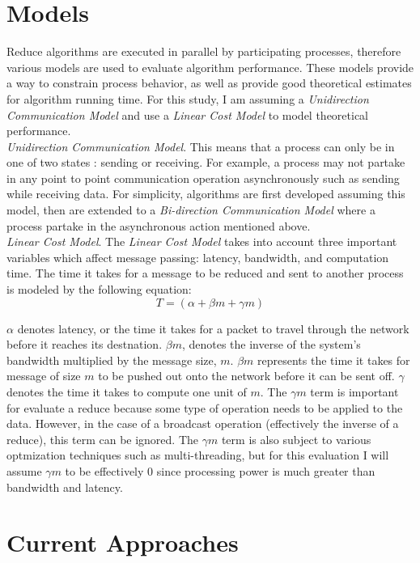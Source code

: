 \documentclass{article}
\begin{document}
\section{Models}

Reduce algorithms are executed in parallel by participating processes, therefore various models are
used to evaluate algorithm performance. These models provide a way to constrain process behavior, as
well as provide good theoretical estimates for algorithm running time. For this study, I am assuming
a \textit{Unidirection Communication Model} and use a \textit{Linear Cost Model} to model 
theoretical performance. \\

\textit{Unidirection Communication Model}. This means that a process can only be in one of two 
states
: sending or receiving. For example, a process may not partake in any point to point communication
operation asynchronously such as sending while receiving data. For simplicity, algorithms are first
developed assuming this model, then are extended to a \textit{Bi-direction Communication Model} 
where a process partake in the asynchronous action mentioned above. \\ 

\textit{Linear Cost Model}. The \textit{Linear Cost Model} takes into account three important 
variables which affect message passing: latency, bandwidth, and computation time. The time it takes
for a message to be reduced and sent to another process is modeled by the following equation:
$$T = (\alpha + \beta m + \gamma m)$$

$\alpha$ denotes latency, or the time it takes for a packet to travel through the network before
it reaches its destnation. $\beta m$, denotes the inverse of the system's bandwidth multiplied by
the message size, $m$. $\beta m$ represents the time it takes for message of size $m$ to be pushed
out onto the network before it can be sent off. $\gamma$ denotes the time it takes to compute one 
unit of $m$. The $\gamma m$ term is important for evaluate a reduce because some type of operation
needs to be applied to the data. However, in the case of a broadcast operation (effectively the
inverse of a reduce), this term can be ignored. The $\gamma m$ term is also subject to various 
optmization techniques such as multi-threading, but for this evaluation I will assume $\gamma m$ to
be effectively 0 since processing power is much greater than bandwidth and latency.

\section{Current Approaches}
\end{document}
